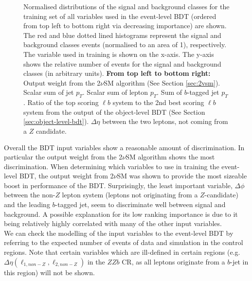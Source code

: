 \begin{figure}
    \caption{Normalised distributions of the signal and background classes for the training set of all variables used in the event-level BDT (ordered from top left to bottom right via decreasing importance) are shown. The red and blue dotted lined histograms represent the signal and background classes events (normalised to an area of 1), respectively. The variable used in training is shown on the x-axis. The y-axis shows the relative number of events for the signal and background classes (in arbitrary units). \textbf{From top left to bottom right:} Output weight from the 2$\nu$SM algorithm (See Section \ref{sec:2vsm}). Scalar sum of jet $p_{T}$. Scalar sum of lepton $p_{T}$. Sum of $b$-tagged jet $p_{T}$. Ratio of the top scoring $\ell b$ system to the 2nd best scoring $\ell b$ system from the output of the object-level BDT (See Section \ref{sec:object-level-bdt}). $\Delta \eta$ between the two leptons, not coming from a $Z$ candidate.}
    \label{fig:norm-event-bdt-vars}
\end{figure}

Overall the BDT input variables show a reasonable amount of discrimination. In particular the output weight from the 2$\nu$SM algorithm shows the most discrimination. When determining which variables to use in training the event-level BDT, the output weight from 2$\nu$SM was shown to provide the most sizeable boost in performance of the BDT. Surprisingly, the least important variable, $\Delta \phi$ between the non-$Z$ lepton system (leptons not originating from a $Z$-candidate) and the leading $b$-tagged jet, seem to discriminate well between signal and background. A possible explanation for its low ranking importance is due to it being relatively highly correlated with many of the other input variables.\\

We can check the modelling of the input variables to the event-level BDT by referring to the expected number of events of data and simulation in the control regions. Note that certain variables which are ill-defined in certain regions (e.g. $\Delta \eta (\ell_{1,non-Z}, \ell_{2,non-Z})$ in the $ZZb$ CR, as all leptons originate from a $b$-jet in this region) will not be shown.\\

